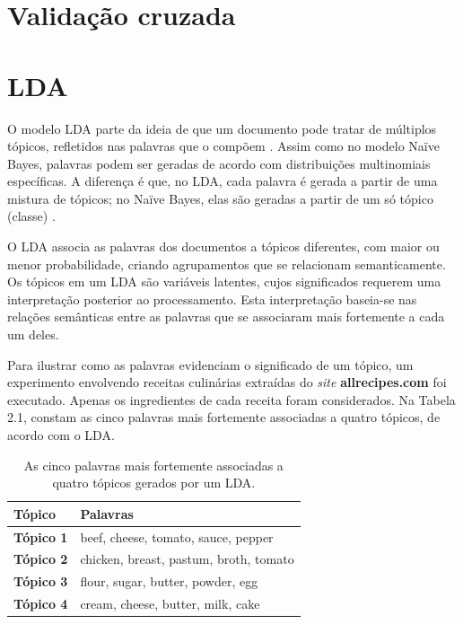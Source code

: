 \section{Validação cruzada}

\section{LDA}
\label{subsection:LDA}


O modelo LDA parte da ideia de que um documento pode tratar de múltiplos tópicos, refletidos nas palavras que o compõem \cite{pnas}. Assim como no modelo Naïve Bayes, palavras podem ser geradas de acordo com distribuições multinomiais específicas. A diferença é que, no LDA, cada palavra é gerada a partir de uma mistura de tópicos; no Naïve Bayes, elas são geradas a partir de um só tópico (classe) \cite{gibbs-lingpipe}.

O LDA associa as palavras dos documentos a tópicos diferentes, com maior ou menor probabilidade, criando agrupamentos que se relacionam semanticamente. Os tópicos em um LDA são variáveis latentes, cujos significados requerem uma interpretação posterior ao processamento. Esta interpretação baseia-se nas relações semânticas entre as palavras que se associaram mais fortemente a cada um deles. %

Para ilustrar como as palavras evidenciam o significado de um tópico, um experimento envolvendo receitas culinárias extraídas do \emph{site} \textbf{allrecipes.com} foi executado. Apenas os ingredientes de cada receita foram considerados. Na Tabela 2.1, constam as cinco palavras mais fortemente associadas a quatro tópicos, de acordo com o LDA. %

\begin{table}[t]
\centering
\label{LDA:1}
\begin{tabular}{| l | p{7cm} | }
\hline
\textbf{Tópico} & \textbf{Palavras} \\ \hline
\textbf{Tópico 1} & beef, cheese, tomato, sauce, pepper \\ \hline
\textbf{Tópico 2} & chicken, breast, pastum, broth, tomato \\ \hline
\textbf{Tópico 3} & flour, sugar, butter, powder, egg  \\ \hline
\textbf{Tópico 4} & cream, cheese, butter, milk, cake \\ \hline
\end{tabular}
\caption{As cinco palavras mais fortemente associadas a quatro tópicos gerados por um LDA.}
\end{table}

